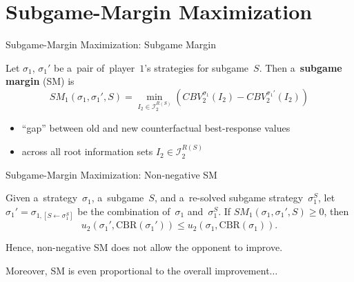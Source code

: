 \documentclass{beamer}
\theoremstyle{definition}
\newcommand{\I}{\mathcal{I}}
\begin{document}
  \section{Subgame-Margin Maximization}

  \begin{frame}{Subgame-Margin Maximization: Subgame Margin}
    \pause
    \begin{framed}
      Let $\sigma_1$, $\sigma_1'$ be a~pair of~player~$1$'s strategies for subgame~$S$.
      Then a~\textbf{subgame margin} (SM) is
      \[
        SM_1 (\sigma_1, \sigma_1' , S) =
        \min_{I_2 \in \I_2^{R(S)}}
        \left( CBV_2^{\sigma_1} (I_2) - CBV_2^{\sigma_1'} (I_2) \right)
      \]
    \end{framed}
    \pause

    \begin{itemize}[<+- | alert@+>]
      \item ``gap'' between old and new counterfactual best-response values
      \item across all root information sets $I_2 \in \I_2^{R(S)}$
    \end{itemize}
  \end{frame}

  \begin{frame}{Subgame-Margin Maximization: Non-negative SM}
    \begin{framed}
      \begin{Theorem}
        Given a~strategy~$\sigma_1$, a~subgame~$S$, and a~re-solved subgame strategy~$\sigma_1^S$, let $\sigma_1' = \sigma_{1, [S \leftarrow \sigma_1^S]}$ be the combination of~$\sigma_1$ and~$\sigma_1^S$.
        If $SM_1 (\sigma_1, \sigma_1' , S) \geq 0$, then
        \[
          u_2(\sigma_1', \textrm{CBR}(\sigma_1')) \leq  u_2(\sigma_1, \textrm{CBR}(\sigma_1)).
        \]
      \end{Theorem}
    \end{framed}
    \pause

    Hence, non-negative SM does not allow the opponent to improve.
    \pause

    Moreover, SM is even proportional to the overall improvement$\ldots$
  \end{frame}
\end{document}
